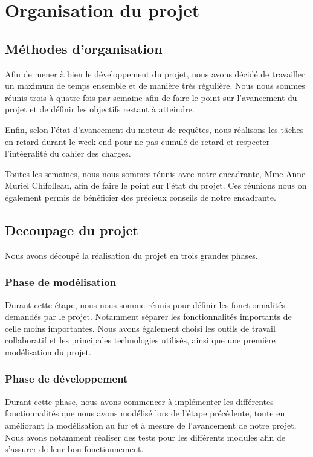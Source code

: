 \documentclass[oneside,13pt,a4paper]{report}
\begin{document}
\chapter{Organisation du projet}
\section{Méthodes d’organisation}

Afin de mener à bien le développement du projet, nous avons décidé de travailler un maximum de temps ensemble et de manière très régulière. Nous nous sommes réunis trois à quatre fois par semaine afin de faire le point sur l’avancement du projet et de définir les objectifs restant à atteindre.

Enfin, selon l’état d’avancement du moteur de requêtes, nous réalisons les tâches en retard durant le week-end pour ne pas cumulé de retard et respecter l’intégralité du cahier des charges.

Toutes les semaines, nous nous sommes réunis avec notre encadrante, Mme Anne-Muriel Chifolleau, afin de faire le point sur l’état du projet. Ces réunions nous on également permis de bénéficier des précieux conseils de notre encadrante.

\section{Decoupage du projet}

Nous avons découpé la réalisation du projet en trois grandes phases.

\subsection{Phase de modélisation}

Durant cette étape, nous nous somme réunis pour définir les fonctionnalités demandés par le projet. Notamment séparer les fonctionnalités importants de celle moins importantes. Nous avons également choisi les outils de travail collaboratif et les principales technologies utilisés, ainsi que une première modélisation du projet.

\subsection{Phase de développement}

Durant cette phase, nous avons commencer à implémenter les différentes fonctionnalités que nous avons modélisé lors de l’étape précédente, toute en améliorant la modélisation au fur et à mesure de l’avancement de notre projet. Nous avons notamment réaliser des tests pour les différents modules afin de s’assurer de leur bon fonctionnement.
\end{document}
